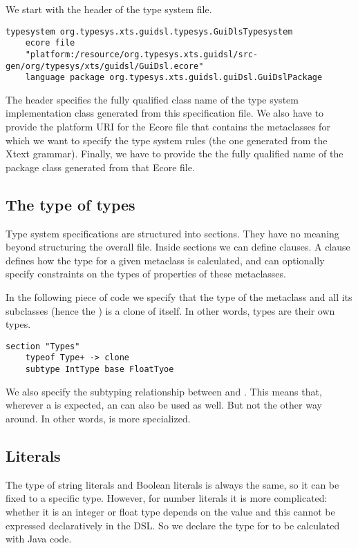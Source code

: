 We start with the header of the type system file.

\begin{lstlisting}[language=xts] 
typesystem org.typesys.xts.guidsl.typesys.GuiDlsTypesystem 
    ecore file 
    "platform:/resource/org.typesys.xts.guidsl/src-gen/org/typesys/xts/guidsl/GuiDsl.ecore"
    language package org.typesys.xts.guidsl.guiDsl.GuiDslPackage 
\end{lstlisting}

The header specifies the fully qualified class name of the type system
implementation class generated from this specification file. We also have to
provide the platform URI for the Ecore file that contains the metaclasses for
which we want to specify the type system rules (the one generated from the Xtext
grammar). Finally, we have to provide the the fully qualified name of the
package class generated from that Ecore file.

\subsection{The type of types}

Type system specifications  are structured into sections. They have no meaning
beyond structuring the overall file. Inside sections we can define 
clauses. A  clause defines how the type for a given metaclass is
calculated, and can optionally specify constraints on the types of properties of
these metaclasses.

In the following piece of code we specify  that the type
of the  metaclass and all its subclasses (hence the \ic{+}) is a clone of itself.
In other words, types are their own types.

\begin{lstlisting}[language=xts] 
section "Types"
    typeof Type+ -> clone
    subtype IntType base FloatTyoe
\end{lstlisting}

We also specify the subtyping relationship between  and . This
means that, wherever a  is expected, an  can also be
used as well.  But not the other way around. In other words,  is more
specialized.

\subsection{Literals}

The type of string literals and Boolean literals is always the same, so it can
be fixed to a specific type.
However, for number literals it is more complicated:
whether it is an integer or float type depends on the value and this cannot be
expressed declaratively in the DSL. So we declare the type for
 to be calculated with Java code.

